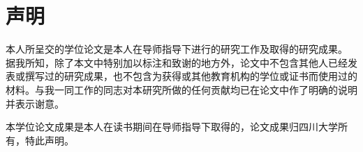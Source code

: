 
\chapter{声明}
本人所呈交的学位论文是本人在导师指导下进行的研究工作及取得的研究成果。
据我所知，除了本文中特别加以标注和致谢的地方外，论文中不包含其他人已经发表或撰写过的研究成果，也不包含为获得{\universityname}或其他教育机构的学位或证书而使用过的材料。与我一同工作的同志对本研究所做的任何贡献均已在论文中作了明确的说明并表示谢意。

本学位论文成果是本人在{\universityname}读书期间在导师指导下取得的，论文成果归四川大学所有，特此声明。
\vspace{4cm}
\autograph
